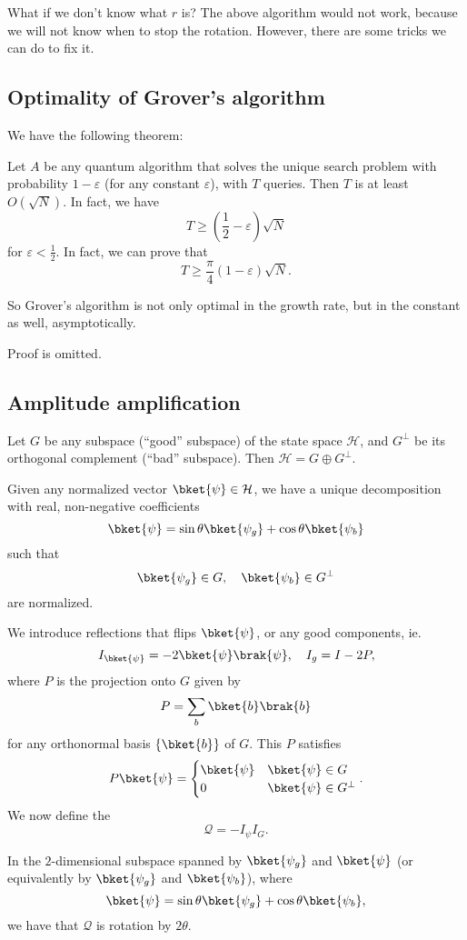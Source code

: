 \documentclass[a4paper]{article}
\begin{document}
What if we don't know what $r$ is? The above algorithm would not work, because we will not know when to stop the rotation. However, there are some tricks we can do to fix it.

\subsection{Optimality of Grover's algorithm}
We have the following theorem:
\begin{thm}
  Let $A$ be any quantum algorithm that solves the unique search problem with probability $1 - \varepsilon$ (for any constant $\varepsilon$), with $T$ queries. Then $T$ is at least $O(\sqrt{N})$. In fact, we have
  \[
    T \geq \left(\frac{1}{2} - \varepsilon\right) \sqrt{N}
  \]
  for $\varepsilon < \frac{1}{2}$. In fact, we can prove that
  \[
    T \geq \frac{\pi}{4}(1 - \varepsilon) \sqrt{N}.
  \]
\end{thm}
So Grover's algorithm is not only optimal in the growth rate, but in the constant as well, asymptotically.

Proof is omitted.

\subsection{Amplitude amplification}
Let $G$ be any subspace (``good'' subspace) of the state space $\mathcal{H}$, and $G^\perp$ be its orthogonal complement (``bad'' subspace). Then $\mathcal{H} = G \oplus G^\perp$.

Given any normalized vector $\bket{\psi} \in \mathcal{H}$, we have a unique decomposition with real, non-negative coefficients
\[
  \bket{\psi} = \sin \theta \bket{\psi_g} + \cos \theta \bket{\psi_b}
\]
such that
\[
  \bket{\psi_g} \in G,\quad \bket{\psi_b} \in G^\perp
\]
are normalized.

We introduce reflections that flips $\bket{\psi}$, or any good components, ie.
\[
  I_{\bket{\psi}} = -2\bket{\psi}\brak{\psi},\quad I_g = I - 2P,
\]
where $P$ is the projection onto $G$ given by
\[
  P = \sum_b \bket{b}\brak{b}
\]
for any orthonormal basis $\{\bket{b}\}$ of $G$. This $P$ satisfies
\[
  P \bket{\psi} =
  \begin{cases}
    \bket{\psi} & \bket{\psi} \in G\\
    0 & \bket{\psi} \in G^\perp
  \end{cases}.
\]
We now define the 
\[
  \mathcal{Q} = - I_\psi I_G.
\]
\begin{thm}
  In the $2$-dimensional subspace spanned by $\bket{\psi_g}$ and $\bket{\psi}$ (or equivalently by $\bket{\psi_g}$ and $\bket{\psi_b}$), where
  \[
    \bket{\psi} = \sin \theta \bket{\psi_g} + \cos \theta \bket{\psi_b},
  \]
  we have that $\mathcal{Q}$ is rotation by $2 \theta$.
\end{thm}
\end{document}
